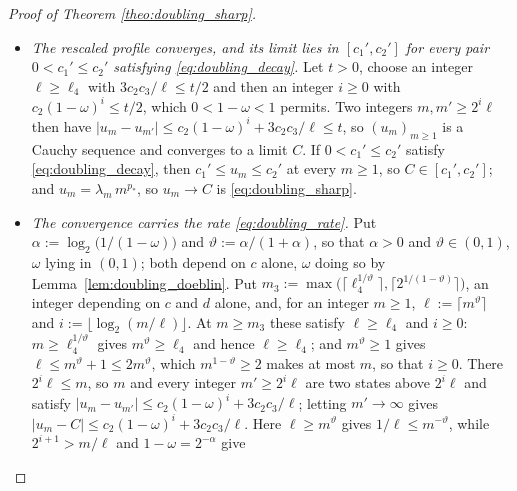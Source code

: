 \begin{proof}[Proof of Theorem \ref{theo:doubling_sharp}]
\begin{itemize}
\begin{equation}
\begin{aligned}
        &+\;c_2\,\mathbb E\bigl(|Z_{\ell'}-1|\mid Y_0=m'\bigr) .
    \end{aligned}
    \end{equation}
    Both $Y_{N_{\ell'}}$ and $m$ are states of the block $I_j(\ell)$, so the first term is at
    most $c_2(1-\omega)^{j}+2c_2c_3/\ell$; and \eqref{eq:doubling_weight} at the level
    $\ell'\geq\ell_3$ and the starting state $m'\geq2\ell'$ bounds the second by
    $c_2c_3/\ell'$. With $(1-\omega)^{j}\leq(1-\omega)^{i}$ and $\ell'\geq\ell$, this is the
    announced bound.
    \item \emph{The rescaled profile converges, and its limit lies in $[c_1',c_2']$ for every
    pair $0<c_1'\leq c_2'$ satisfying \eqref{eq:doubling_decay}.} Let $t>0$, choose an integer
    $\ell\geq\ell_4$ with $3c_2c_3/\ell\leq t/2$ and then an integer $i\geq0$ with
    $c_2(1-\omega)^{i}\leq t/2$, which $0<1-\omega<1$ permits. Two integers
    $m,m'\geq2^{i}\ell$ then have $|u_m-u_{m'}|\leq c_2(1-\omega)^{i}+3c_2c_3/\ell\leq t$, so
    $(u_m)_{m\geq1}$ is a Cauchy sequence and converges to a limit $C$. If
    $0<c_1'\leq c_2'$ satisfy \eqref{eq:doubling_decay}, then $c_1'\leq u_m\leq c_2'$ at every
    $m\geq1$, so $C\in[c_1',c_2']$; and $u_m=\lambda_m\,m^{p_*}$, so $u_m\rightarrow C$ is
    \eqref{eq:doubling_sharp}.
    \item \emph{The convergence carries the rate \eqref{eq:doubling_rate}.} Put
    $\alpha:=\log_2\bigl(1/(1-\omega)\bigr)$ and $\vartheta:=\alpha/(1+\alpha)$, so that
    $\alpha>0$ and $\vartheta\in(0,1)$, $\omega$ lying in $(0,1)$; both depend on $c$ alone,
    $\omega$ doing so by Lemma~\ref{lem:doubling_doeblin}. Put
    $m_3:=\max\bigl(\lceil\ell_4^{1/\vartheta}\rceil,\lceil2^{1/(1-\vartheta)}\rceil\bigr)$,
    an integer depending on $c$ and $d$ alone, and, for an integer $m\geq1$,
    $\ell:=\lceil m^{\vartheta}\rceil$ and $i:=\lfloor\log_2(m/\ell)\rfloor$. At $m\geq m_3$
    these satisfy $\ell\geq\ell_4$ and $i\geq0$: $m\geq\ell_4^{1/\vartheta}$ gives
    $m^{\vartheta}\geq\ell_4$ and hence $\ell\geq\ell_4$; and $m^{\vartheta}\geq1$ gives
    $\ell\leq m^{\vartheta}+1\leq2m^{\vartheta}$, which $m^{1-\vartheta}\geq2$ makes at most
    $m$, so that $i\geq0$. There $2^{i}\ell\leq m$, so $m$ and every integer
    $m'\geq2^{i}\ell$ are two states above $2^{i}\ell$ and satisfy
    $|u_m-u_{m'}|\leq c_2(1-\omega)^{i}+3c_2c_3/\ell$; letting $m'\rightarrow\infty$ gives
    $|u_m-C|\leq c_2(1-\omega)^{i}+3c_2c_3/\ell$. Here $\ell\geq m^{\vartheta}$ gives
    $1/\ell\leq m^{-\vartheta}$, while $2^{i+1}>m/\ell$ and $1-\omega=2^{-\alpha}$ give

\end{itemize}
\end{proof}
